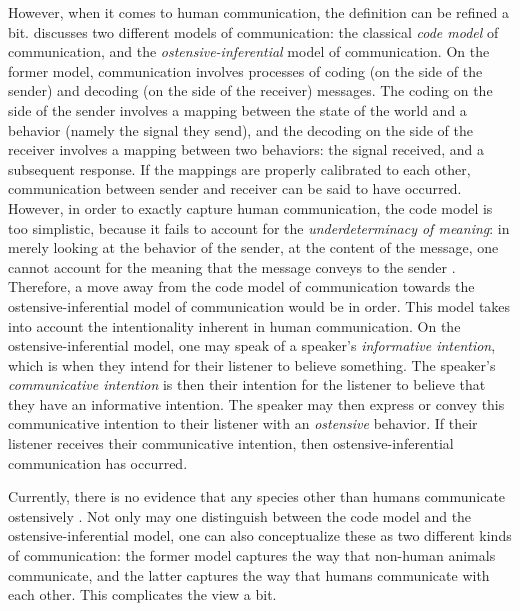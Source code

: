 However, when it comes to human communication, the definition can be refined a bit. \citet{Scott-Phillips18-communication, Scott-Phillips15-primate} discusses two different models of communication: the classical \emph{code model} of communication, and the \emph{ostensive-inferential} model of communication.
On the former model, communication involves processes of coding (on the side of the sender) and decoding (on the side of the receiver) messages. The coding on the side of the sender involves a mapping between the state of the world and a behavior (namely the signal they send), and the decoding on the side of the receiver involves a mapping between two behaviors: the signal received, and a subsequent response. If the mappings are properly calibrated to each other, communication between sender and receiver can be said to have occurred.
However, in order to exactly capture human communication, the code model is too simplistic, because it fails to account for the \emph{underdeterminacy of meaning}: in merely looking at the behavior of the sender, at the content of the message, one cannot account for the meaning that the message conveys to the sender \citep{Scott-Phillips18-communication}. 
Therefore, a move away from the code model of communication towards the ostensive-inferential model of communication would be in order. This model takes into account the intentionality inherent in human communication.
On the ostensive-inferential model, one may speak of a speaker's \emph{informative intention}, which is when they intend for their listener to believe something. The speaker's \emph{communicative intention} is then their intention for the listener to believe that they have an informative intention. The speaker may then express or convey this communicative intention to their listener with an \emph{ostensive} behavior. If their listener receives their communicative intention, then ostensive-inferential communication has occurred.

Currently, there is no evidence that any species other than humans communicate ostensively \citep{Scott-Phillips18-communication}. Not only may one distinguish between the code model and the ostensive-inferential model, one can also conceptualize these as two different kinds of communication: the former model captures the way that non-human animals communicate, and the latter captures the way that humans communicate with each other. This complicates the view a bit.

